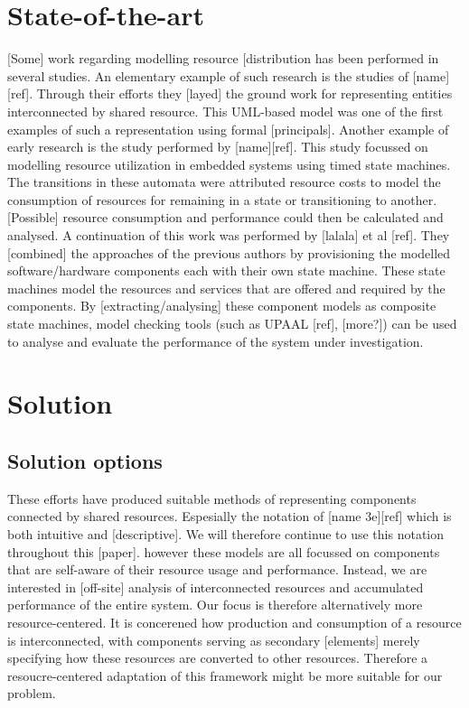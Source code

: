 \section{State-of-the-art}
[Some] work regarding modelling resource [distribution has been performed in several studies. An elementary example of such research is the studies of [name][ref]. Through their efforts they [layed] the ground work for representing entities interconnected by shared resource. This UML-based model was one of the first examples of such a representation using formal [principals]. Another example of early research is the study performed by [name][ref]. This study focussed on modelling resource utilization in embedded systems using timed state machines. The transitions in these automata were attributed resource costs to model the consumption of resources for remaining in a state or transitioning to another. [Possible] resource consumption and performance could then be calculated and analysed. 
A continuation of this work was performed by [lalala] et al [ref]. They [combined] the approaches of the previous authors by provisioning the modelled software/hardware components each with their own state machine. These state machines model the resources and services that are offered and required by the components. By [extracting/analysing] these component models as composite state machines, model checking tools (such as UPAAL [ref], [more?]) can be used to analyse and evaluate the performance of the system under investigation.

\section{Solution}
\subsection{Solution options}
These efforts have produced suitable methods of representing components connected by shared resources. Espesially the notation of [name 3e][ref] which is both intuitive and [descriptive]. We will therefore continue to use this notation throughout this [paper]. 
however these models are all focussed on components that are self-aware of their resource usage and performance. Instead, we are interested in [off-site] analysis of interconnected resources and accumulated performance of the entire system. Our focus is therefore alternatively more resource-centered. It is concerened how production and consumption of a resource is interconnected, with components serving as secondary [elements] merely specifying how these resources are converted to other resources. Therefore a resoucre-centered adaptation of this framework might be more suitable for our problem.

